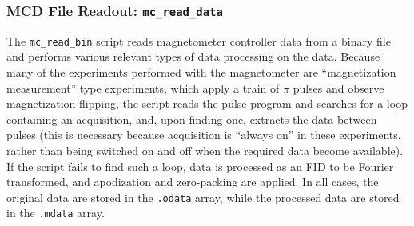 \documentclass[PaulGanssle-Thesis.tex]{subfiles}
\begin{document}
\subsubsection{MCD File Readout: \texttt{mc\_read\_data}}
\label{Section:mc_read_data}
The \texttt{mc\_read\_bin} script reads magnetometer controller data from a binary file and performs various relevant types of data processing on the data. Because many of the experiments performed with the magnetometer are ``magnetization measurement'' type experiments, which apply a train of $\pi$ pulses and observe magnetization flipping, the script reads the pulse program and searches for a loop containing an acquisition, and, upon finding one, extracts the data between pulses (this is necessary because acquisition is ``always on'' in these experiments, rather than being switched on and off when the required data become available). If the script fails to find such a loop, data is processed as an FID to be Fourier transformed, and apodization and zero-packing are applied. In all cases, the original data are stored in the \texttt{.odata} array, while the processed data are stored in the \texttt{.mdata} array.
\end{document}
